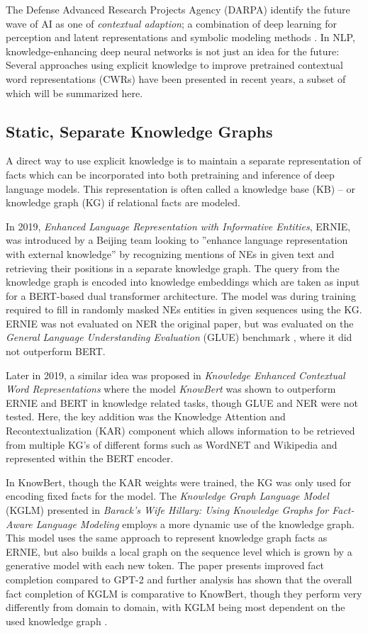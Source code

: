 \documentclass[main.tex]{subfiles}
\begin{document}
The Defense Advanced Research Projects Agency (DARPA) identify the future wave of AI as one of \emph{contextual adaption}; a combination of deep learning for perception and latent representations and symbolic modeling methods \cite{darpa17ai}.
In NLP, knowledge-enhancing deep neural networks is not just an idea for the future:
Several approaches using explicit knowledge to improve pretrained contextual word representations (CWRs) have been presented in recent years, a subset of which will be summarized here.

\subsection{Static, Separate Knowledge Graphs}
A direct way to use explicit knowledge is to maintain a separate representation of facts which can be incorporated into both pretraining and inference of deep language models.
This representation is often called a knowledge base (KB)  -- or knowledge graph (KG) if relational facts are modeled.

In 2019, \emph{Enhanced Language Representation with Informative Entities}, ERNIE, was introduced by a Beijing team \cite{zhang2019ernie} looking to ''enhance language representation  with  external  knowledge'' \cite[1]{zhang2019ernie} by recognizing mentions of NEs in given text and retrieving their positions in a separate knowledge graph.
The query from the knowledge graph is encoded into knowledge embeddings which are taken as input for a BERT-based dual transformer architecture.
The model was during training required to fill in randomly masked NEs entities in given sequences using the KG.
ERNIE was not evaluated on NER the original paper, but was evaluated on the \emph{General Language Understanding Evaluation} (GLUE) benchmark \cite{wang2018glue}, where it did not outperform BERT.

Later in 2019, a similar idea was proposed in \emph{Knowledge Enhanced Contextual Word Representations} where the model \emph{KnowBert} \cite{peters2019knowbert} was shown to outperform ERNIE and BERT in knowledge related tasks, though GLUE and NER were not tested.
Here, the key addition was the Knowledge Attention and Recontextualization (KAR) component which allows information to be retrieved from multiple KG's of different forms such as WordNET and Wikipedia and represented within the BERT encoder.

In KnowBert, though the KAR weights were trained, the KG was only used for encoding fixed facts for the model.
The \emph{Knowledge Graph Language Model} (KGLM) presented in \emph{Barack’s Wife Hillary: Using Knowledge Graphs for Fact-Aware Language Modeling} \cite{logan2019barack} employs a more dynamic use of the knowledge graph.
This model uses the same approach to represent knowledge graph facts as ERNIE, but also builds a local graph on the sequence level which is grown by a generative model with each new token.
The paper presents improved fact completion compared to GPT-2 and further analysis has shown that the overall fact completion of KGLM is comparative to KnowBert, though they perform very differently from domain to domain, with KGLM being most dependent on the used knowledge graph \cite{birk2020knowledge}.
\end{document}
